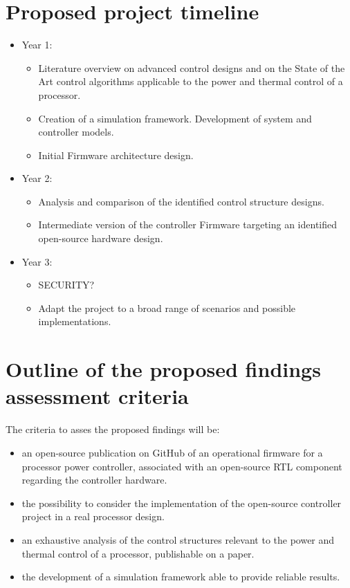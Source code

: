 \section{Proposed project timeline}
\begin{itemize}
\item{Year 1:
\begin{itemize}
    \item Literature overview on advanced control designs and on the State of the Art control algorithms applicable to the power and thermal control of a processor.
    \item Creation of a simulation framework. Development of system and controller models.
    \item Initial Firmware architecture design.
\end{itemize}
}

\item{Year 2:
\begin{itemize}
    \item Analysis and comparison of the identified control structure designs.
    \item Intermediate version of the controller Firmware targeting an identified open-source hardware design.
\end{itemize}
}

\item{Year 3:
\begin{itemize}
    \item SECURITY? 
    \item Adapt the project to a broad range of scenarios and possible implementations.
\end{itemize}
}
\end{itemize}



\section{Outline of the proposed findings assessment criteria}
The criteria to asses the proposed findings will be:
\begin{itemize}
    \item an open-source publication on GitHub of an operational firmware for a processor power controller, associated with an open-source RTL component regarding the controller hardware.
    \item the possibility to consider the implementation of the open-source controller project in a real processor design.
    \item an exhaustive analysis of the control structures relevant to the power and thermal control of a processor, publishable on a paper.
    \item the development of a simulation framework able to provide reliable results.
\end{itemize}


